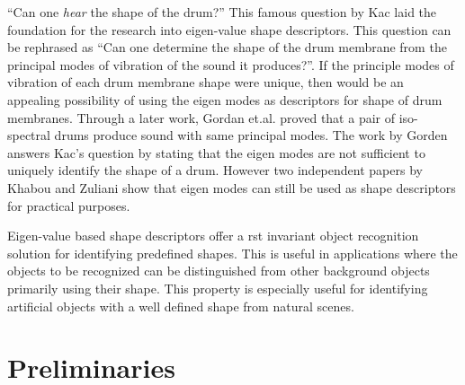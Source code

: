 \documentclass {udthesis}
\begin{document}
``Can one \emph{hear} the shape of the drum?'' This famous question by Kac \cite{kac} laid the foundation for the research into eigen-value shape descriptors.
This question can be rephrased as ``Can one determine the shape of the drum membrane from the principal modes of vibration of the sound it produces?''.
If the principle modes of vibration of each drum membrane shape were unique, then would be an appealing possibility of using the eigen modes as descriptors for shape of drum membranes. 
Through a later work, Gordan et.al.\cite{gordon} proved that a pair of iso-spectral drums produce sound with same principal modes. The work by Gorden answers Kac's question by stating that the eigen modes are not sufficient to uniquely identify the shape of a drum. However two independent papers by Khabou and Zuliani \cite{khabou,zuliani} show that eigen modes can still be used as shape descriptors for practical purposes.

Eigen-value based shape descriptors offer a \gls{rst} invariant object recognition solution for identifying predefined shapes. This is useful in applications where the objects to be recognized can be distinguished from other background objects primarily using their shape. This property is especially useful for identifying artificial objects with a well defined shape from natural scenes.


\section{Preliminaries}
\end{document}
